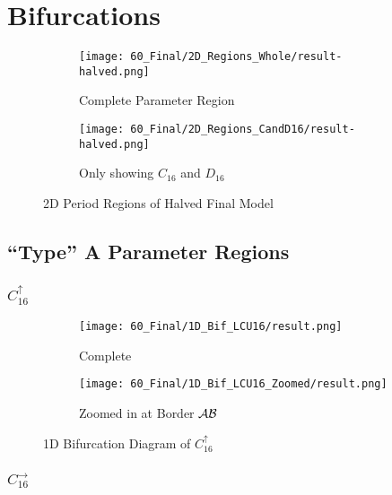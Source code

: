 \section{Bifurcations}


\begin{figure}
    \centering
    \begin{subfigure}{0.4\textwidth}
        \centering
        \texttt{[image: 60\_Final/2D\_Regions\_Whole/result-halved.png]}
        \caption{Complete Parameter Region}
        \label{fig:final.regions.whole.halved}
    \end{subfigure}
    \begin{subfigure}{0.4\textwidth}
        \centering
        \texttt{[image: 60\_Final/2D\_Regions\_CandD16/result-halved.png]}
        \caption{Only showing $C_{16}$ and $D_{16}$}
        \label{fig:final.regions.CandD16.halved}
    \end{subfigure}
    \caption{2D Period Regions of Halved Final Model}
\end{figure}


\subsection{``Type'' A Parameter Regions}

\subsubsection{$C_{16}^\uparrow$}

\begin{figure}
    \centering
    \begin{subfigure}{0.4\textwidth}
        \centering
        \texttt{[image: 60\_Final/1D\_Bif\_LCU16/result.png]}
        \caption{Complete}
        \label{fig:bifurcation.C.up}
    \end{subfigure}
    \begin{subfigure}{0.4\textwidth}
        \centering
        \texttt{[image: 60\_Final/1D\_Bif\_LCU16\_Zoomed/result.png]}
        \caption{Zoomed in at Border $\mathcal{A}\mathcal{B}$}
        \label{fig:bifurcation.C.up.zoomed}
    \end{subfigure}
    \caption{1D Bifurcation Diagram of $C_{16}^\uparrow$}
\end{figure}

\subsubsection{$C_{16}^\rightarrow$}

